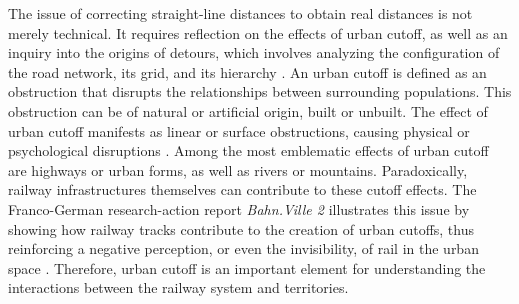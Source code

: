 \begin{refsegment}
The issue of correcting straight-line distances to obtain real distances is not merely technical. It requires reflection on the effects of urban cutoff, as well as an inquiry into the origins of detours, which involves analyzing the configuration of the road network, its grid, and its hierarchy \textcolor{blue}{\autocite[119]{heran_distances_2009}}. An urban cutoff is defined as an obstruction that disrupts the relationships between surrounding populations. This obstruction can be of natural or artificial origin, built or unbuilt. The effect of urban cutoff manifests as linear or surface obstructions, causing physical or psychological disruptions \textcolor{blue}{\autocite[4]{heran_zones_2009}}. Among the most emblematic effects of urban cutoff are highways or urban forms, as well as rivers or mountains. Paradoxically, railway infrastructures themselves can contribute to these cutoff effects. The Franco-German research-action report \textsl{Bahn.Ville 2} illustrates this issue by showing how railway tracks contribute to the creation of urban cutoffs, thus reinforcing a negative \gls{perception}, or even the invisibility, of rail in the urban space \textcolor{blue}{\autocite[20]{lhostis_concevoir_2009}}. Therefore, urban cutoff is an important element for understanding the interactions between the railway system and territories.%


\end{refsegment}

